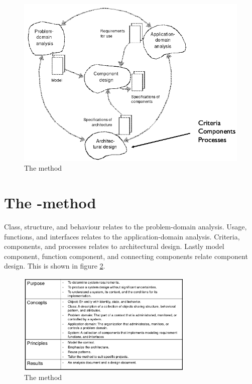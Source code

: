 \begin{figure}[h]
    \centering
    \includegraphics[scale=1.5]{figures/methodcircular.png}
    \caption{The method}
    \label{fig:methodcircular}
\end{figure}

\section{The \ad-method}
Class, structure, and behaviour relates to the problem-domain analysis. Usage, functions, and interfaces relates to the application-domain analysis. Criteria, components, and processes relates to architectural design. Lastly model component, function component, and connecting components relate component design. This is shown in figure \ref{fig:methodcircular}.

\begin{figure}[h]
    \centering
    \includegraphics[width=0.75\textwidth]{figures/ooadmedthodsummary.png}
    \caption{The \ad method}
    \label{fig:methodcircular}
\end{figure}

